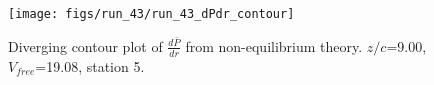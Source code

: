 \begin{figure}[H]
\centering
\texttt{[image: figs/run\_43/run\_43\_dPdr\_contour]}
\caption{Diverging contour plot of $\frac{d\bar{P}}{dr}$ from non-equilibrium theory. $z/c$=9.00, $V_{free}$=19.08, station 5.}
\label{fig:run_43_dPdr_contour}
\end{figure}



